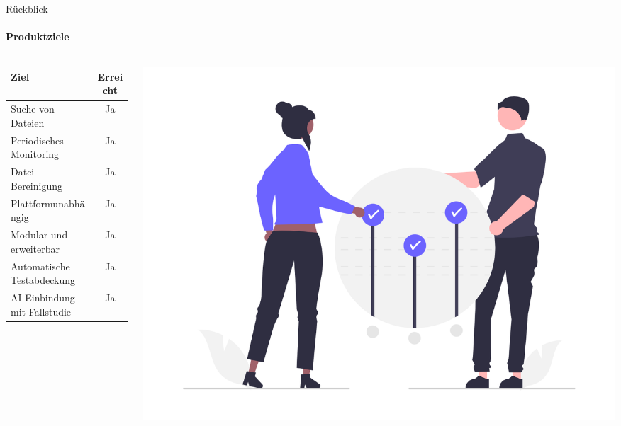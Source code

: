 \documentclass[
    ngerman,%
    authorontitle=true,
]{bfhbeamer}
\begin{document}
    \begin{frame}{Rückblick}
        \framesubtitle{Produktziele}
        \begin{columns}
            \begin{column}{0.5\textwidth}
                \begin{tabular}{l|c}
                    \textbf{Ziel}                & \textbf{Erreicht} \\
                    \hline
                    Suche von Dateien            & Ja                \\
                    Periodisches Monitoring      & Ja                \\
                    Datei-Bereinigung            & Ja                \\
                    Plattformunabhängig          & Ja                \\
                    Modular und erweiterbar      & Ja                \\
                    Automatische Testabdeckung   & Ja                \\
                    AI-Einbindung mit Fallstudie & Ja                \\
                \end{tabular}\par
            \end{column}
            \begin{column}{0.5\textwidth}
                \includegraphics[width=1\textwidth]{assets/presentation/goals}
            \end{column}
        \end{columns}
    \end{frame}
\end{document}
